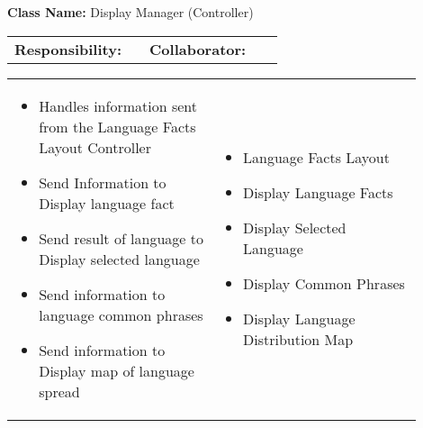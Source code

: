 \begin{cards}[]
    \textbf{Class Name:} Display Manager (Controller)
    \tcbline
    \begin{tabular}{p{0.45\linewidth} | p{0.45\linewidth}}
        \textbf{Responsibility:}& 
        \textbf{Collaborator:}\\
    \end{tabular}
    \tcbline
    \begin{tabular}{p{0.45\linewidth} | p{0.45\linewidth}}
        \begin{itemize}
            \item Handles information sent from the Language Facts Layout Controller
            \item Send Information to Display language fact
            \item Send result of language to Display selected language
            \item Send information to language common phrases
            \item Send information to Display map of language spread
            
        \end{itemize}
        &
        \begin{itemize}
            \item Language Facts Layout
            \item Display Language Facts
            \item Display Selected Language
            \item Display Common Phrases
            \item Display Language Distribution Map

        \end{itemize}
    \end{tabular}
\end{cards}